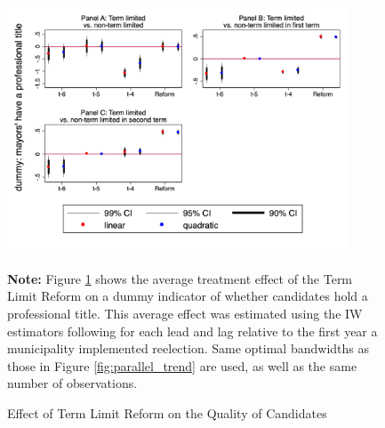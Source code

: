 \documentclass[12pt]{amsart}
\numberwithin{equation}{section}
\theoremstyle{definition}
\theoremstyle{definition}
\theoremstyle{definition}
\begin{document}
 \begin{figure}[h]   
\centering
 \caption{Effect of Term Limit Reform on the Quality of Candidates}
 \label{fig:quality_trend}
\includegraphics[width=0.9\textwidth]{../Figures_incumbency/quality_parallel.png}
       \captionsetup{justification=centering}
         
 \textbf{Note:} Figure \ref{fig:quality_trend} shows the average treatment effect of the Term Limit Reform on a dummy indicator of whether candidates hold a professional title. This average effect was estimated using the IW estimators following \citet{abraham_sun_2020} for each lead and lag relative to the first year a municipality implemented reelection. Same optimal bandwidths as those in Figure \ref{fig:parallel_trend} are used, as well as the same number of observations.  
 
\end{figure}     
\end{document}
